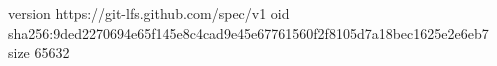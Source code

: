 version https://git-lfs.github.com/spec/v1
oid sha256:9ded2270694e65f145e8c4cad9e45e67761560f2f8105d7a18bec1625e2e6eb7
size 65632
